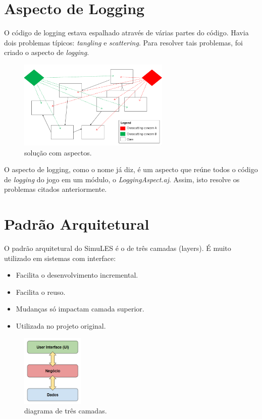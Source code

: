 \documentclass[11pt]{article}
\begin{document}
\section{Aspecto de Logging}
\label{sec:org4ff6012}
O código de logging estava espalhado através de várias partes do código. Havia dois
problemas típicos: \emph{tangling} e \emph{scattering}.  Para resolver tais problemas, foi criado
o aspecto de \emph{logging}.
\begin{figure}[H]
\centering
\includegraphics[height=160px]{./img/solution.png}
\caption{solução com aspectos.}
\end{figure} 
O aspecto de logging, como o nome já diz, é um aspecto que reúne todos o código de
\emph{logging} do jogo em um módulo, o \emph{LoggingAspect.aj}. Assim, isto resolve os problemas
citados anteriormente.
\pagebreak
\section{Padrão Arquitetural}
\label{sec:org8e10a82}
O padrão arquitetural do SimuLES é o de três camadas (layers). É muito utilizado em
sistemas com interface:
\begin{itemize}
\item Facilita o desenvolvimento incremental.
\item Facilita o reuso.
\item Mudanças só impactam camada superior.
\item Utilizada no projeto original.
\end{itemize}
\begin{figure}[H]
\centering
\includegraphics[height=130px]{./img/layers.png}
\caption{diagrama de três camadas.}
\end{figure} 
\end{document}

